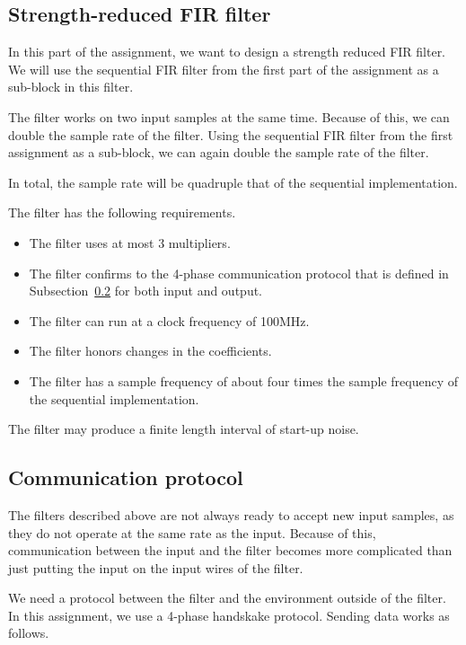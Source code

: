 \subsection{Strength-reduced FIR filter}
In this part of the assignment, we want to design a strength reduced FIR filter.
We will use the sequential FIR filter from the first part of the assignment as a sub-block in this filter.

The filter works on two input samples at the same time.
Because of this, we can double the sample rate of the filter.
Using the sequential FIR filter from the first assignment as a sub-block, we can again double the sample rate of the filter.

In total, the sample rate will be quadruple that of the sequential implementation.

The filter has the following requirements.

\begin{itemize}
	\item The filter uses at most 3 multipliers.
	\item The filter confirms to the 4-phase communication protocol that is defined in Subsection~\ref{sec:analysis:communication} for both input and output.
	\item The filter can run at a clock frequency of 100MHz.
	\item The filter honors changes in the coefficients.
	\item The filter has a sample frequency of about four times the sample frequency of the sequential implementation.
\end{itemize}

The filter may produce a finite length interval of start-up noise.

\subsection{Communication protocol}
\label{sec:analysis:communication}

The filters described above are not always ready to accept new input samples, as they do not operate at the same rate as the input.
Because of this, communication between the input and the filter becomes more complicated than just putting the input on the input wires of the filter.

We need a protocol between the filter and the environment outside of the filter.
In this assignment, we use a 4-phase handskake protocol.
Sending data works as follows.


